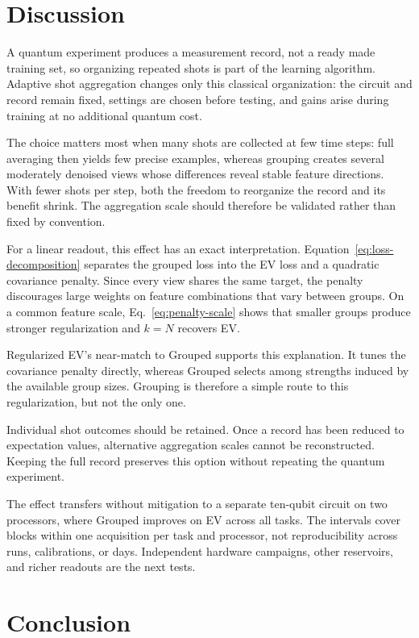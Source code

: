 \section{Discussion}
\label{sec:discussion}

A quantum experiment produces a measurement record, not a ready made training
set, so organizing repeated shots is part of the learning algorithm. Adaptive
shot aggregation changes only this classical organization: the circuit and
record remain fixed, settings are chosen before testing, and gains arise during
training at no additional quantum cost.

The choice matters most when many shots are collected at few time steps: full
averaging then yields few precise examples, whereas grouping creates several
moderately denoised views whose differences reveal stable feature directions.
With fewer shots per step, both the freedom to reorganize the record and its
benefit shrink. The aggregation scale should therefore be validated rather
than fixed by convention.

For a linear readout, this effect has an exact interpretation.
Equation~\eqref{eq:loss-decomposition} separates the grouped loss into the EV
loss and a quadratic covariance penalty. Since every view shares the same
target, the penalty discourages large weights on feature combinations that
vary between groups. On a common feature scale, Eq.~\eqref{eq:penalty-scale}
shows that smaller groups produce stronger regularization and $k=N$ recovers
EV.

Regularized EV's near-match to Grouped supports this explanation. It tunes the
covariance penalty directly, whereas Grouped selects among strengths induced by
the available group sizes. Grouping is therefore a simple route to this
regularization, but not the only one.

Individual shot outcomes should be retained. Once a record has been reduced to expectation
values, alternative aggregation scales cannot be reconstructed. Keeping the
full record preserves this option without repeating the quantum experiment.

The effect transfers without mitigation to a separate ten-qubit circuit on two
processors, where Grouped improves on EV across all tasks. The intervals cover
blocks within one acquisition per task and processor, not reproducibility
across runs, calibrations, or days. Independent hardware campaigns, other
reservoirs, and richer readouts are the next tests.

\section{Conclusion}
\label{sec:conclusion}

